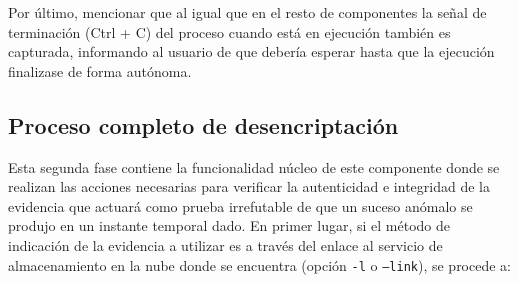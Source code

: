 \documentclass[12pt,a4paper, twoside]{report}
\begin{document}
	Por último, mencionar que al igual que en el resto de componentes la señal de terminación (Ctrl + C) del proceso cuando está en ejecución también es capturada, informando al usuario de que debería esperar hasta que la ejecución finalizase de forma autónoma.

	 \subsection{Proceso completo de desencriptación}

	Esta segunda fase contiene la funcionalidad núcleo de este componente donde se realizan las acciones necesarias para verificar la autenticidad e integridad de la evidencia que actuará como prueba irrefutable de que un suceso anómalo se produjo en un instante temporal dado. En primer lugar, si el método de indicación de la evidencia a utilizar es a través del enlace al servicio de almacenamiento en la nube donde se encuentra (opción \texttt{-l} o \texttt{--link}), se procede a:
	
\end{document}
